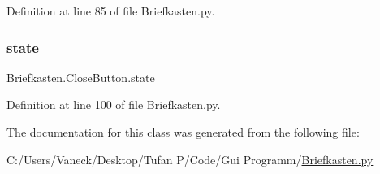 Definition at line 85 of file Briefkasten.\+py.

\mbox{\label{class_briefkasten_1_1_close_button_aa862c2ede33f8b03e9ff0ce97b3c78c6}} 
\subsubsection{\texorpdfstring{state}{state}}
{\footnotesize\ttfamily Briefkasten.\+Close\+Button.\+state}



Definition at line 100 of file Briefkasten.\+py.



The documentation for this class was generated from the following file\+:\begin{DoxyCompactItemize}
\item 
C\+:/\+Users/\+Vaneck/\+Desktop/\+Tufan P/\+Code/\+Gui Programm/\mbox{\hyperlink{_briefkasten_8py}{Briefkasten.\+py}}\end{DoxyCompactItemize}
